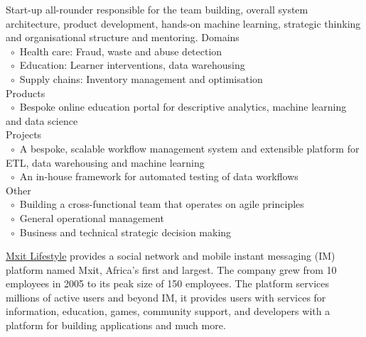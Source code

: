 \documentclass[10pt,a4paper,final]{columncv}
\newcommand{\cvitembullet}{~$\circ$~}
\newcommand{\cvitempbullet}{\phantom{\cvitembullet}}
\begin{document}
\begin{cvenv}
         {Start-up all-rounder responsible for the team building, overall system architecture,  
         product development, hands-on machine learning, strategic thinking and organisational
	       structure and mentoring.}
         {Domains \\ 
          \cvitembullet Health care: Fraud, waste and abuse detection \\
          \cvitembullet Education: Learner interventions, data warehousing \\
          \cvitembullet Supply chains: Inventory management and optimisation \\
          Products \\
          \cvitembullet Bespoke online education portal for descriptive analytics,  
          \cvitempbullet machine learning and data science \\
          Projects \\
          \cvitembullet A bespoke, scalable workflow management system and extensible 
          \cvitempbullet platform for ETL, data warehousing and machine learning \\
          \cvitembullet An in-house framework for automated testing of data workflows \\
          Other \\
          \cvitembullet Building a cross-functional team that operates on agile principles \\
          \cvitembullet General operational management \\
          \cvitembullet Business and technical strategic decision making
          }
\end{cvenv}

\noindent \href{http://www.mxit.com/}{Mxit Lifestyle} provides a social network and mobile 
          instant messaging (IM) platform named Mxit, Africa's first and largest. The 
          company grew from 10 employees in 2005 to its peak size of 150 
          employees. The platform services millions of active users and beyond IM,
          it provides users with services for information, education, games, community 
          support, and developers with a platform for building applications and much more. 
\\[-3em]
\end{document}
